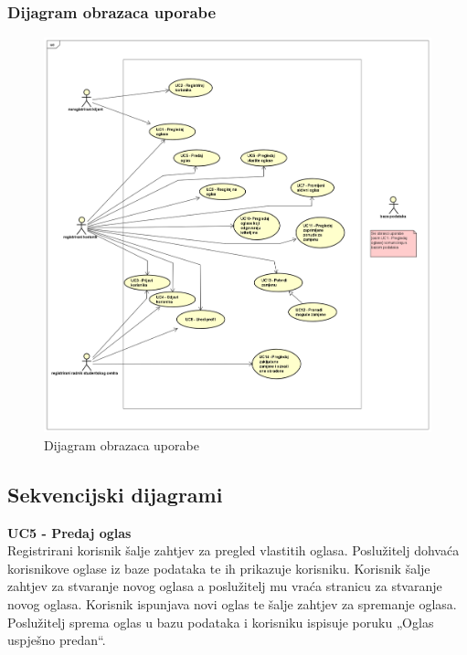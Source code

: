 \eject

\subsubsection{Dijagram obrazaca uporabe}

\begin{figure}[H]
	\includegraphics[width=.9\linewidth]{slike/UC_Diagram.PNG} %
	\centering
	\caption{Dijagram obrazaca uporabe}
	\label{fig:UC_Diagram} %
\end{figure}

\eject	

\subsection{Sekvencijski dijagrami}
	
		\textbf{UC5 - Predaj oglas}
		\textit\\
		Registrirani korisnik šalje zahtjev za pregled vlastitih oglasa. Poslužitelj dohvaća korisnikove oglase iz baze podataka te ih prikazuje korisniku. Korisnik šalje zahtjev za stvaranje novog oglasa a poslužitelj mu vraća stranicu za stvaranje novog oglasa. Korisnik ispunjava novi oglas te šalje zahtjev za spremanje oglasa. Poslužitelj sprema oglas u bazu podataka i korisniku ispisuje poruku „Oglas uspješno predan“.

